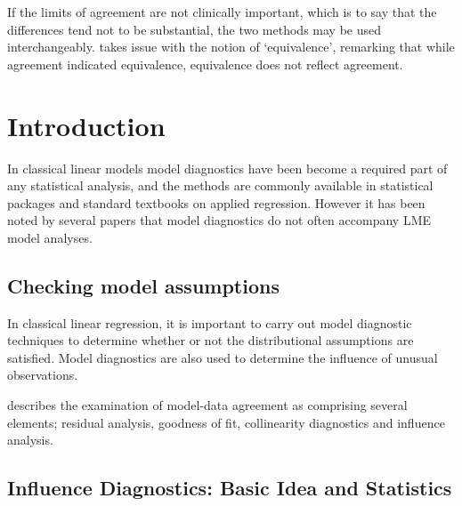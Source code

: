 \documentclass[12pt, a4paper]{report}
\theoremstyle{plain}
\theoremstyle{definition}
\theoremstyle{remark}
\begin{document}
If the limits of agreement are not clinically important, which is
to say that the differences tend not to be substantial, the two
methods may be used interchangeably. \citet{DunnSEME} takes issue
with the notion of `equivalence', remarking that while agreement
indicated equivalence, equivalence does not reflect agreement.




\section{Introduction}%
In classical linear models model diagnostics have been become a required part of any statistical analysis, and the methods are commonly available in statistical packages and standard textbooks on applied regression. However it has been noted by several papers that model diagnostics do not often accompany LME model analyses.

\subsection{Checking model assumptions}
In classical linear regression, it is important to carry out model diagnostic techniques to determine whether or not the distributional assumptions are satisfied. Model diagnostics are also used to determine the influence of unusual observations.

\citet{schabenberger} describes the examination of model-data agreement as comprising several elements; residual analysis, goodness of fit, collinearity diagnostics and influence analysis.

\subsection{Influence Diagnostics: Basic Idea and Statistics}
\end{document}
